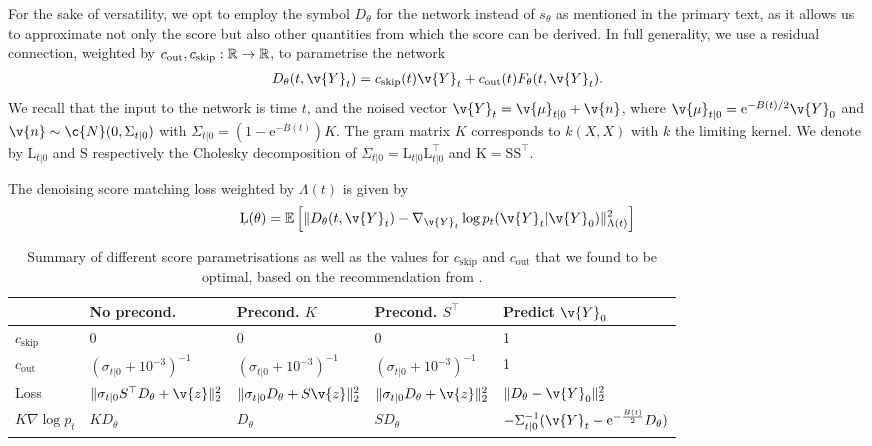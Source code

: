 For the sake of versatility, we opt to employ the symbol $D_\theta$ for the network instead of $s_\theta$ as mentioned in the primary text, as it allows us to approximate not only the score but also other quantities from which the score can be derived.
In full generality, we use a residual connection, weighted by ${c}_{\text{out}}, {c}_{\text{skip}}: \mathbb{R} \rightarrow \mathbb{R}$, to parametrise the network \begin{align} D_\theta(t, \v{Y}_t) = c_{\text{skip}}(t) \v{Y}_t + c_{\text{out}}(t) F_\theta(t, \v{Y}_t).
\end{align}
We recall that the input to the network is time $t$, and the noised vector $\v{Y}_t = \v{\mu}_{t|0} + \v{n}$, where $\v{\mu}_{t|0} = \textrm{e}^{-B(t)/2} \v{Y}_0$ and $\v{n} \sim \c{N}(0, \Sigma_{t|0})$ with $\Sigma_{t|0} = (1 - \textrm{e}^{-B(t)}) K$.
The gram matrix $K$ corresponds to $k(X, X)$ with $k$ the limiting kernel.
We denote by $\mathrm{L}_{t|0}$ and $\mathrm{S}$ respectively the Cholesky decomposition of $\Sigma_{t|0}=\mathrm{L}_{t|0} \mathrm{L}_{t|0}^\top$ and $\mathrm{K} = \mathrm{S} \mathrm{S}^\top$.

The denoising score matching loss weighted by $\Lambda(t)$ is given by \begin{align} \label{eq:app:loss} \c{L}(\theta) = \mathbb{E} \left[\| {D}_\theta(t, \v{Y}_t) - \nabla_{{\v{Y}}_t} \log p_{t}(\v{Y}_t| \v{Y}_0)\|_{\Lambda(t)}^2 \right] \end{align} 

\begin{table}[] \centering \small \begin{tabular}{lllll} \toprule                 & No precond.
                                                & Precond. $K$                                & Precond. $S^\top$                         & Predict $\v{Y}_0$                   \\
               \midrule
               $c_\text{skip}$                  & 0                                           & 0                                         & 0                               & 1 \\
               $c_\text{out}$                   & $(\sigma_{t|0} + 10^{-3})^{-1}$             & $(\sigma_{t|0} + 10^{-3})^{-1}$           & $(\sigma_{t|0} + 10^{-3})^{-1}$ & 1 \\
               Loss                             & $\|\sigma_{t|0}
               S^\top D_{\theta} + \v{z}\|_2^2$ & $\|\sigma_{t|0} D_{\theta} + S \v{z}\|_2^2$ & $\|\sigma_{t|0} D_{\theta} + \v{z}\|_2^2$ & $\|D_{\theta} - \v{Y}_0\|^2_2$      \\ $K \nabla \log p_t$ & $K D_\theta$ & $D_\theta$ & $ S D_\theta $ & $-\Sigma_{t|0}^{-1}(\v{Y}_t - \textrm{e}^{{-}\frac{B(t)}{2}} D_\theta)$ \\ \bottomrule\end{tabular} \caption{Summary of different score parametrisations as well as the values for $c_{\text{skip}}$ and $c_{\text{out}}$ that we found to be optimal, based on the recommendation from \textcite[Appendix B.6]{karras2022Elucidating}.
	}\label{tab:app:score-param}
\end{table}

